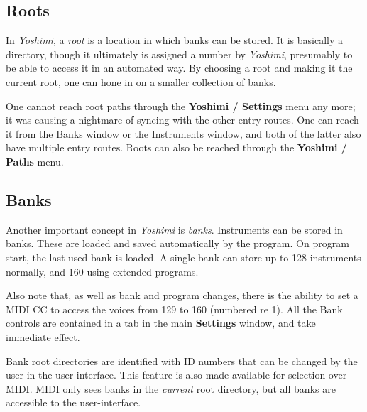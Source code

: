 \subsection{Roots}
\label{subsec:banks_and_roots_roots}

   In \textsl{Yoshimi}, a \textsl{root} is a location in which banks can be
   stored.  It is basically a directory, though it ultimately is assigned a
   number by \textsl{Yoshimi}, presumably to be able to access it in an
   automated way.  By choosing a root and making it the current root, one
   can hone in on a smaller collection of banks.

   One cannot reach root paths through the \textbf{Yoshimi / Settings} menu
   any more; it was causing a nightmare of syncing with the other entry
   routes. One can reach it from the Banks window
   or the Instruments window,
   and both of the latter also have multiple entry routes.
   Roots can also be reached through the \textbf{Yoshimi / Paths} menu.

\subsection{Banks}
\label{subsec:banks_and_roots_banks}
   
   Another important concept in \textsl{Yoshimi} is \textsl{banks}.  Instruments
   can be stored in banks. These are loaded and saved automatically by the
   program.  On program start, the last used bank is loaded. A single bank
   can store up to 128 instruments normally, and 160 using extended programs.


%

   Also note that, as well as bank and program changes, there is the ability
   to set a MIDI CC to access the voices from 129 to 160 (numbered re 1).
   All the Bank
   controls are contained in a tab in the main \textbf{Settings}
   window, and take immediate effect.

   Bank root directories are identified with ID numbers that can be changed
   by the user in the user-interface. This feature is also made available for
   selection over MIDI.  MIDI only sees banks in the \textsl{current} root
   directory, but all banks are accessible to the user-interface.


